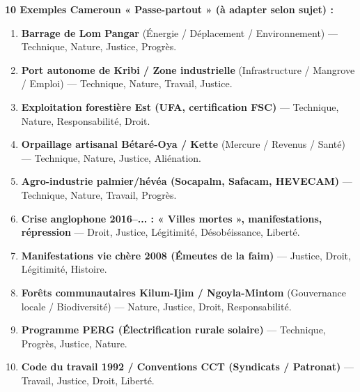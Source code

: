 \documentclass[11pt]{article}
\begin{document}
\begin{exemplebox}
\textbf{10 Exemples Cameroun « Passe-partout » (à adapter selon sujet) :}
\begin{enumerate}
\item \textbf{Barrage de Lom Pangar} (Énergie / Déplacement / Environnement) — Technique, Nature, Justice, Progrès.
\item \textbf{Port autonome de Kribi / Zone industrielle} (Infrastructure / Mangrove / Emploi) — Technique, Nature, Travail, Justice.
\item \textbf{Exploitation forestière Est (UFA, certification FSC)} — Technique, Nature, Responsabilité, Droit.
\item \textbf{Orpaillage artisanal Bétaré-Oya / Kette} (Mercure / Revenus / Santé) — Technique, Nature, Justice, Aliénation.
\item \textbf{Agro-industrie palmier/hévéa (Socapalm, Safacam, HEVECAM)} — Technique, Nature, Travail, Progrès.
\item \textbf{Crise anglophone 2016–... : « Villes mortes », manifestations, répression} — Droit, Justice, Légitimité, Désobéissance, Liberté.
\item \textbf{Manifestations vie chère 2008 (Émeutes de la faim)} — Justice, Droit, Légitimité, Histoire.
\item \textbf{Forêts communautaires Kilum-Ijim / Ngoyla-Mintom} (Gouvernance locale / Biodiversité) — Nature, Justice, Droit, Responsabilité.
\item \textbf{Programme PERG (Électrification rurale solaire)} — Technique, Progrès, Justice, Nature.
\item \textbf{Code du travail 1992 / Conventions CCT (Syndicats / Patronat)} — Travail, Justice, Droit, Liberté.
\end{enumerate}
\end{exemplebox}
\end{document}
